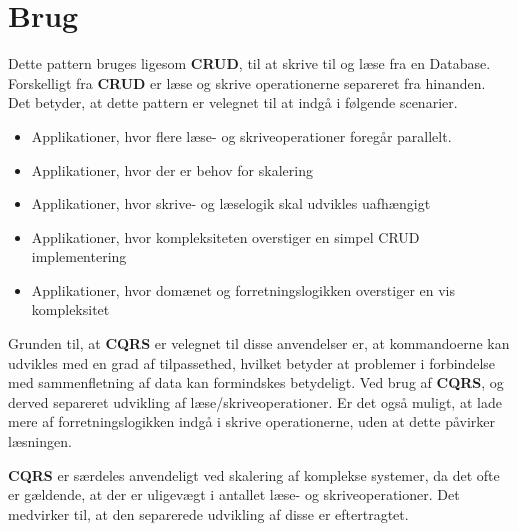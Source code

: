 \section{Brug}
Dette pattern bruges ligesom \textbf{CRUD}, til at skrive til og læse fra en Database. Forskelligt fra \textbf{CRUD} er læse og skrive operationerne separeret fra hinanden. Det betyder, at dette pattern er velegnet til at indgå i følgende scenarier.

\begin{itemize}  
	\item Applikationer, hvor flere læse- og skriveoperationer foregår parallelt.
	\item Applikationer, hvor der er behov for skalering
	\item Applikationer, hvor skrive- og læselogik skal udvikles uafhængigt
	\item Applikationer, hvor kompleksiteten overstiger en simpel CRUD implementering
	\item Applikationer, hvor domænet og forretningslogikken overstiger en vis kompleksitet
	
\end{itemize}

Grunden til, at \textbf{CQRS} er velegnet til disse anvendelser er, at kommandoerne kan udvikles med en grad af tilpassethed, hvilket betyder at problemer i forbindelse med sammenfletning af data kan formindskes betydeligt.
Ved brug af \textbf{CQRS}, og derved separeret udvikling af læse/skriveoperationer. Er det også muligt, at lade mere af forretningslogikken indgå i skrive operationerne, uden at dette påvirker læsningen.

\textbf{CQRS} er særdeles anvendeligt ved skalering af komplekse systemer, da det ofte er gældende, at der er uligevægt i antallet læse- og skriveoperationer. Det medvirker til, at den separerede udvikling af disse er eftertragtet.
 


